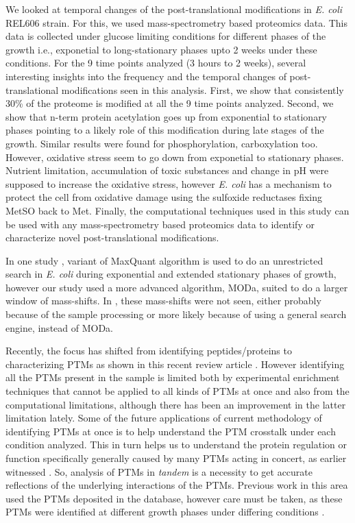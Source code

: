 \documentclass[12pt]{article}
\begin{document}
We looked at temporal changes of the post-translational modifications in \emph{E. coli} REL606 strain. For this, we used mass-spectrometry based proteomics data. This data is collected under glucose limiting conditions for different phases of the growth i.e., exponetial to long-stationary phases upto 2 weeks under these conditions. For the 9 time points analyzed (3 hours to 2 weeks), several interesting insights into the frequency and the temporal changes of post-translational modifications seen in this analysis. First, we show that consistently 30\% of the proteome is modified at all the 9 time points analyzed. Second, we show that n-term protein acetylation goes up from exponential to stationary phases pointing to a likely role of this modification during late stages of the growth. Similar results were found for phosphorylation, carboxylation too. However, oxidative stress seem to go down from exponetial to stationary phases. Nutrient limitation, accumulation of toxic substances and change in pH were supposed to increase the oxidative stress, however \emph{E. coli} has a mechanism to protect the cell from oxidative damage using the sulfoxide reductases fixing MetSO back to Met. Finally, the computational techniques used in this study can be used with any mass-spectrometry based proteomics data to identify or characterize novel post-translational modifications.

In one study \cite{Soufietal2015}, variant of MaxQuant algorithm is used to do an unrestricted search in \emph{E. coli} during exponential and extended stationary phases of growth, however our study used a more advanced algorithm, MODa, suited to do a larger window of mass-shifts. In \cite{Soufietal2015}, these mass-shifts were not seen, either probably because of the sample processing or more likely because of using a general search engine, instead of MODa. 

Recently, the focus has shifted from identifying peptides/proteins to characterizing PTMs as shown in this recent review article \cite{OlsenMann2013}. However identifying all the PTMs present in the sample is limited both by experimental enrichment techniques that cannot be applied to all kinds of PTMs at once and also from the computational limitations, although there has been an improvement in the latter limitation lately. Some of the future applications of current methodology of identifying PTMs at once is to help understand the PTM crosstalk under each condition analyzed. This in turn helps us to understand the protein regulation or function specifically generally caused by many PTMs acting in concert, as earlier witnessed \cite{Pengetal2014}. So, analysis of PTMs in \emph{tandem} is a necessity to get accurate reflections of the underlying interactions of the PTMs. Previous work in this area used the PTMs deposited in the database, however care must be taken, as these PTMs were identified at different growth phases under differing conditions \cite{Pengetal2014}.
\end{document}
